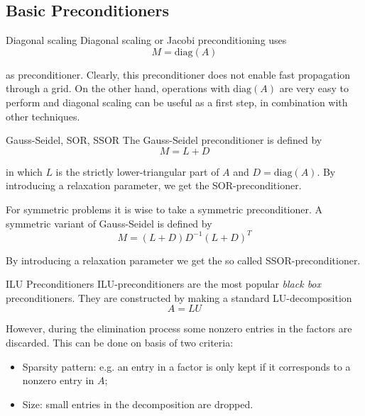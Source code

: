 \subsection{Basic Preconditioners}
\begin{frame}{Diagonal scaling}
  Diagonal scaling or Jacobi preconditioning uses
  \begin{equation*}
    M = \textrm{diag}(A)
  \end{equation*}

as preconditioner. Clearly, this preconditioner does not enable
fast propagation through a grid. On the other hand, operations
with $\textrm{diag}(A)$ are very easy to perform and diagonal scaling can
be useful as a first step, in combination with other techniques.

\end{frame}

\begin{frame}{Gauss-Seidel, SOR, SSOR}
  The Gauss-Seidel preconditioner is defined by
  \begin{equation*}
    M = L + D
  \end{equation*}

in which $L$ is the strictly lower-triangular part of $A$ and
$D = \textrm{diag}(A)$. By introducing a relaxation parameter, we get the
  SOR-preconditioner.

For symmetric problems it is wise to take a symmetric
preconditioner. A symmetric variant of Gauss-Seidel is defined
by
\begin{equation*}
M = (L + D)D^{-1}(L + D)^T
\end{equation*}

By introducing a relaxation parameter we get the so called
SSOR-preconditioner.
\end{frame}

\begin{frame}{ILU Preconditioners}
  ILU-preconditioners are the most popular \emph{black box}
preconditioners. They are constructed by making a standard
LU-decomposition
\begin{equation*}
A = LU
\end{equation*}

However, during the elimination process some nonzero entries in
the factors are discarded. This can be done on basis of two
criteria:
\begin{itemize}
\item Sparsity pattern: e.g. an entry in a factor is only kept if it
corresponds to a nonzero entry in $A$;
\item Size: small entries in the decomposition are dropped.
\end{itemize}
\end{frame}

